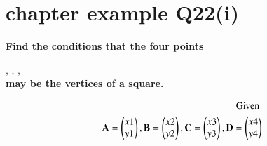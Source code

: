 \documentclass[journal,12pt,twocolumn]{IEEEtran}
\begin{document}
\section{ chapter   example  Q22(i) }
\textbf{Find the conditions that the four points}\\
\vspace{0.1cm}

, ,
, \\

\vspace{0.1cm}
\textbf{ may be the vertices of a square.}

\solution
\begin{align}
    ~\text{Given}~\\ \mathbf{A} = \begin{pmatrix}x1\\y1\end{pmatrix}, \mathbf{B} = \begin{pmatrix}x2\\y2\end{pmatrix}, \mathbf{C} = \begin{pmatrix}x3\\y3\end{pmatrix}, \mathbf{D} = \begin{pmatrix}x4\\y4\end{pmatrix}
\end{align}
\end{document}
